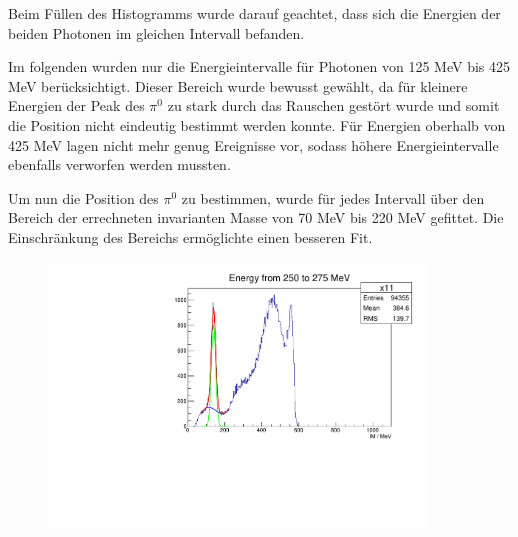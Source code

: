 \documentclass[a4paper,11pt,oneside,final,german,openbib,pdftex]{scrbook}
\begin{document}
{Beim Füllen des Histogramms wurde darauf geachtet, dass sich die Energien der beiden Photonen im gleichen Intervall befanden.


Im folgenden wurden nur die Energieintervalle f\"ur Photonen von 125 MeV bis 425 MeV ber\"ucksichtigt.
Dieser Bereich wurde bewusst gew\"ahlt, da f\"ur kleinere Energien der Peak des $\pi^0$ zu stark durch das Rauschen gest\"ort wurde und somit die Position nicht eindeutig bestimmt werden konnte. F\"ur Energien oberhalb von 425 MeV lagen nicht mehr genug Ereignisse vor, sodass h\"ohere Energieintervalle ebenfalls verworfen werden mussten. 


Um nun die Position des $\pi^0$ zu bestimmen, wurde für jedes Intervall über den Bereich der errechneten invarianten Masse von 70 MeV bis 220 MeV gefittet. Die Einschr\"ankung des Bereichs erm\"oglichte einen besseren Fit.


\begin{figure}[h!]
	\begin{center}
		\includegraphics[width=100mm]{FitExampleRealDataEnergyIntervalSymmetricPhotons}
		

\end{center}
\end{figure}}
\end{document}
